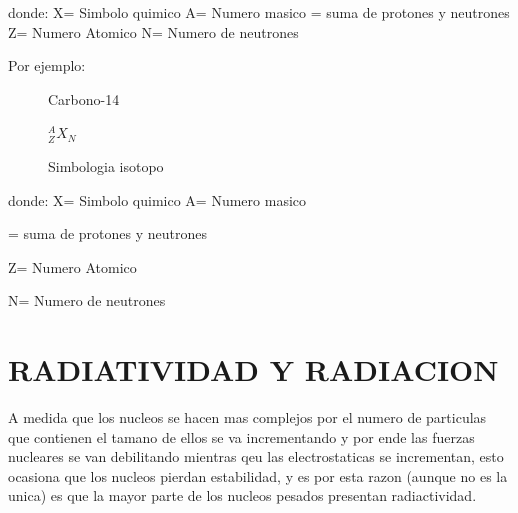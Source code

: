 \documentclass[11pt, oneside]{book}
\begin{document}
\hspace{21mm}      donde: X= Simbolo quimico
\hspace{35mm}   A= Numero masico
\hspace{38mm}   = suma de protones y neutrones
\hspace{35mm}   Z= Numero Atomico
\hspace{35mm}   N= Numero de neutrones


Por ejemplo:

\begin{figure}

  \caption{Carbono-14}
  \begin{centering}
  \end{centering}
\end{figure}

\begin{figure}
  \begin{centering}
    \huge${}^A_ZX_N$
  \end{centering}
  \caption{Simbologia isotopo}
\end{figure}

\hspace{21mm}      donde: X= Simbolo quimico
\hspace{35mm}   A= Numero masico

\hspace{38mm}   = suma de protones y neutrones

\hspace{35mm}   Z= Numero Atomico

\hspace{35mm}   N= Numero de neutrones

\chapter{RADIATIVIDAD Y RADIACION}

A medida que los nucleos se hacen mas complejos por el numero de particulas que
contienen el tamano de ellos se va incrementando y por ende las fuerzas
nucleares se van debilitando mientras qeu las electrostaticas se incrementan,
esto ocasiona que los nucleos pierdan estabilidad, y es por esta razon (aunque
no es la unica) es que la mayor parte de los nucleos pesados presentan
radiactividad.\\
\end{document}
